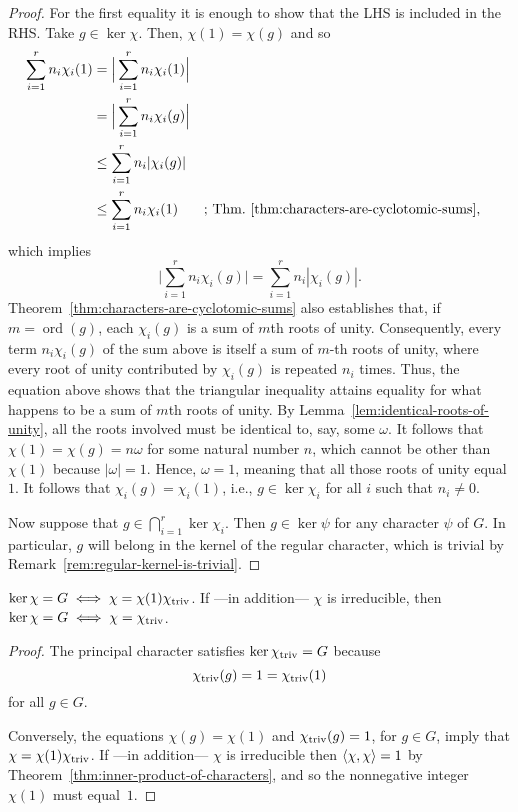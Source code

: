\begin{proof}
    For the first equality it is enough to show that the LHS is included in the RHS. Take $g\in\ker\chi$. Then, $\chi(1)=\chi(g)$ and so
    \begin{align*}
        \sum_{i=1}^rn_i\chi_i(1) 
            &= \Big|\sum_{i=1}^rn_i\chi_i(1)\Big|\\
            &= \Big|\sum_{i=1}^rn_i\chi_i(g)\Big|\\
            &\le \sum_{i=1}^rn_i|\chi_i(g)|\\
            &\le \sum_{i=1}^rn_i\chi_i(1)
                &&\text{; Thm.~\ref{thm:characters-are-cyclotomic-sums}},
    \end{align*}
    \normalsize
    which implies
    $$
         \Big|\sum_{i=1}^rn_i\chi_i(g)\Big|
            = \sum_{i=1}^rn_i|\chi_i(g)|.
    $$
    Theorem~\ref{thm:characters-are-cyclotomic-sums} also establishes that, if $m = \operatorname{ord}(g)$, each $\chi_i(g)$ is a sum of $m$th roots of unity. Consequently, every term $n_i\chi_i(g)$ of the sum above is itself a sum of $m$-th roots of unity, where every root of unity contributed by $\chi_i(g)$ is repeated $n_i$ times. Thus, the equation above shows that the triangular inequality attains equality for what happens to be a sum of $m$th roots of unity. By Lemma~\ref{lem:identical-roots-of-unity}, all the roots involved must be identical to, say, some $\omega$. It follows that $\chi(1)=\chi(g)=n\omega$ for some natural number $n$, which cannot be other than $\chi(1)$ because $|\omega|=1$. Hence, $\omega=1$, meaning that all those roots of unity equal $1$. It follows that $\chi_i(g)=\chi_i(1)$, i.e., $g\in\ker\chi_i$ for all $i$ such that $n_i\ne0$.

    Now suppose that $g\in\bigcap_{i=1}^r\ker\chi_i$. Then $g\in\ker\psi$ for any character $\psi$ of $G$. In particular, $g$ will belong in the kernel of the regular character, which is trivial by Remark~\ref{rem:regular-kernel-is-trivial}.
\end{proof}

\begin{prop}\label{prop:principal-iff-kernel=G}
    $\ker\chi=G\iff\chi=\chi(1){\chi}_{\mathrm{triv}}$. If ---in addition--- $\chi$ is irreducible, then\/ $\ker\chi=G\iff\chi={\chi}_{\mathrm{triv}}$.
\end{prop}

\begin{proof}
    The principal character satisfies $\ker{\chi}_{\mathrm{triv}}=G$ because 
    $$
        {\chi}_{\mathrm{triv}}(g)=1={\chi}_{\mathrm{triv}}(1)
    $$
    for all $g\in G$.
    
    Conversely, the equations $\chi(g)=\chi(1)$ and ${\chi}_{\mathrm{triv}}(g)=1$, for $g\in G$, imply that $\chi=\chi(1){\chi}_{\mathrm{triv}}$. If ---in addition--- $\chi$ is irreducible then $\langle\chi,\chi\rangle=1$ by Theorem~\ref{thm:inner-product-of-characters}, and so the nonnegative integer $\chi(1)$ must equal~$1$.
\end{proof}


